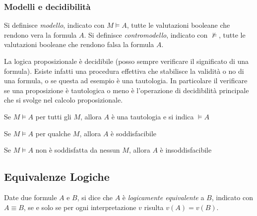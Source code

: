 \documentclass[a4paper,12pt, oneside]{book}
\begin{document}
\subsubsection{Modelli e decidibilità}
Si definisce \emph{modello}, indicato con $M \models A$, tutte le valutazioni
booleane 
che rendono vera la formula $A$.
Si definisce \emph{contromodello}, indicato con $\not\models$, tutte le
valutazioni booleane 
che rendono falsa la formula $A$.

La logica proposizionale è decidibile (posso sempre verificare il significato di
una formula). 
Esiste infatti una procedura effettiva che stabilisce la validità o no di una
formula, o se questa 
ad esempio è una tautologia.
In particolare il verificare se una proposizione è tautologica o meno è
l’operazione di decidibilità principale che si svolge nel calcolo
proposizionale. 

\begin{definizione}
  Se $M \models A$ per tutti gli $M$, allora $A$ è una tautologia e si indica
  $\models A$ 
\end{definizione}

\begin{definizione}
  Se $M \models A$ per qualche $M$, allora $A$ è soddisfacibile
\end{definizione}

\begin{definizione}
  Se $M \models A$ non è soddisfatta da nessun $M$, allora $A$ è
  insoddisfacibile 
\end{definizione}
\subsection{Equivalenze Logiche}
\begin{defi}
  Date due formule $A$ e $B$, si dice che $A$ è \emph{logicamente equivalente} a
  $B$, 
  indicato con $A \equiv B$, se e solo se per ogni interpretazione $v$ risulta
  $v(A) = v(B)$. 
\end{defi}
\end{document}
